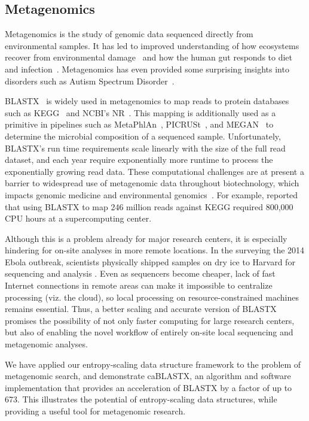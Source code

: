 \documentclass[review,preprint,12pt]{elsarticle}
\renewcommand{\cite}{\citep} %
\theoremstyle{definition}
\theoremstyle{remark}
\numberwithin{equation}{section}
\begin{document}
\subsection{Metagenomics}

Metagenomics is the study of genomic data sequenced directly from environmental
samples.
It has led to improved understanding of how ecosystems recover
from environmental damage~\cite{tyson2004community} and how the human gut responds 
to diet
and infection~\cite{david2014host}.
Metagenomics has even provided some surprising insights into disorders 
such as Autism Spectrum Disorder~\cite{macfabe2012short}.

BLASTX~\cite{altschul1990basic} is widely used in metagenomics to map
reads to protein databases such as KEGG~\cite{kanehisa2000kegg} and NCBI's 
NR~\cite{sayers2011database}.
This mapping is additionally used as a primitive in pipelines such as MetaPhlAn~\cite{segata2012metagenomic}, 
PICRUSt~\cite{langille2013predictive}, and MEGAN~\cite{huson2011integrative} to
determine the microbial composition of a sequenced sample.
Unfortunately, BLASTX's run time requirements scale linearly with the size of the 
full read dataset, and each year require exponentially more runtime to process 
the exponentially growing read data. 
These computational challenges are at present a barrier to widespread use of 
metagenomic data throughout biotechnology, which impacts genomic medicine and 
environmental genomics~\cite{frank2008gastrointestinal}.
For example, \citet{mackelprang2011metagenomic} reported that using BLASTX to map 246
million reads against KEGG required 800,000 CPU hours at a supercomputing 
center.

Although this is a problem already for major research centers, it is especially
hindering for on-site analyses in more remote locations.
In the surveying the 2014 Ebola outbreak, scientists physically shipped samples on dry
ice to Harvard for sequencing and analysis \cite{gire2014genomic}.
Even as sequencers become cheaper, lack of fast Internet connections in remote
areas can make it impossible to centralize processing (viz. the cloud),
so local processing on resource-constrained machines remains essential.
Thus, a better scaling and accurate version of BLASTX promises the possibility of not only faster computing for
large research centers, but also of enabling the novel workflow of
entirely on-site local sequencing and metagenomic analyses.

We have applied our entropy-scaling data structure framework to the problem of 
metagenomic search, and demonstrate caBLASTX, an algorithm and software 
implementation that provides an acceleration of BLASTX by a factor of up 
to 673.
This illustrates the potential of entropy-scaling data structures, while
providing a useful tool for metagenomic research.
\end{document}

